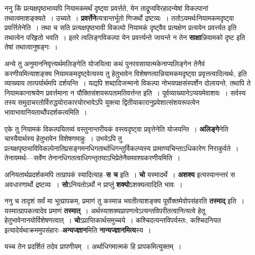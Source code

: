 \documentclass[article,12pt,a4paper]{memoir}
\begin{document}
	  \pstart ननु किं प्रत्यक्षपृष्ठभाव्यपि नियामकमर्थं दृष्ट्वा प्रवर्त्तते, येन ताद्रूप्यविरहादन्येषां विकल्पानां तथात्वमाशङ्क्यते । उच्यते । \textbf{प्रवर्त्तेने}त्यत्रान्तर्भूतो णिजर्थो द्रष्टव्यः । ततोऽयमर्थःनियामकमदृष्ट्वा प्रवर्त्तितेनेति । तथा च सति प्रत्यक्षपृष्ठभावी विकल्पो नियामकं दृष्ट्वैव प्रत्यक्षेण प्रत्ययेन प्रवर्त्त्यत इति तथात्वेन परिहृतो भवति । इतरे त्वलिङ्गविकल्पा येन प्रवर्त्त्यन्ते जायन्ते न तेन \textbf{साक्षा}न्नियामको दृष्ट इति तेषां तथात्वानुषङ्गः ।
	\pend
      

	  \pstart अन्ये तु अनुमाननिवृत्त्यर्थमलिङ्गेति योजयित्वा कथं पुनरवसायात्मकेनाप्यलिङ्गेन तेनैवं करणीयमित्याशङ्क्य नियामकमदृष्ट्वेत्यस्य तु हेतुभावेन विशेषणत्वान्नियामकमदृष्ट्वा प्रवृत्तत्वादित्यर्थः, इति व्याख्याय तात्पर्यार्थमपि दर्शयन्ति । यद्यपि शब्दादिजन्मानो विकल्पा नोभयपक्षसंस्पर्शेन दोलायन्ते, तथापि ते नियामकानाश्रयेण प्रवर्त्तमाना न यौक्तिसंशयरूपतामतिवर्त्तन्त इति । पूर्वव्याख्यानेऽप्ययमेवाशयः । सर्वस्य तस्य समुदाचरतोर्विरुद्धयोराकारयोरभावेऽपि युक्त्या द्वितीयाकारानुप्रवेशात्संशयरूपत्वेन भावाभावानियतार्थोपदर्शकत्वमिति ।
	\pend
      

	  \pstart एके तु नियामकं विकल्पयितव्यं वस्तुनान्तरीयकं वस्त्वदृष्ट्वा प्रवृत्तेनेति योजयन्ति । \textbf{अलिङ्गे}नेति चास्यैवार्थस्य हेतुभावेन विशेषणमाहुः । उभयेऽपि तु प्रत्यक्षपृष्ठभाविविकल्पेनातिप्रसङ्गमनधिगतार्थाधिगन्तुर्विकल्प्यस्य प्रामाण्यचिन्ताऽधिकारेण निराकुर्वते । तेनायमर्थः—सर्वेण तेनानधिगतत्वाधिगन्तृतयाऽभिप्रेतेनैवमवश्यकरणीयमिति ।
	\pend
      

	  \pstart अनियतार्थप्रदर्शकमपि तत्प्रापकं स्यादित्याह--\textbf{स च} इति । \textbf{चो} यस्मादर्थे । \textbf{अशक्य} इत्यस्यानन्तरं स अवधारणार्थो द्रष्टव्यः । \textbf{सो}ऽनियतोऽर्थो न प्राप्तुं \textbf{शक्यो}ऽशक्यत्वादिति भावः ।
	\pend
      

	  \pstart ननु च तादृशं सर्वं मा भूत्प्रापकम्, प्रमाणं तु कस्मान्न भवतीत्याशङ्क्य पूर्वोक्तमेवोपसंहरति \textbf{तस्माद्} इति । यस्मात्प्रापकत्वादेव प्रमाणं \textbf{तस्मात्} । अर्थस्याशक्यप्रापणत्वेऽत्यन्तविपरीतत्वानित्यत्वे हेतू हेतुभावेनानयोर्विशेषणत्वात् । \textbf{चो}ऽप्राप्तिकार्थसमुच्चये । कश्चिदत्यन्तविपर्यस्तः, कश्चिदनियत इत्यादेर्यथाक्रममुपसंहारः--\textbf{अन्यज्ज्ञान}मिति \textbf{नान्यज्ज्ञानमित्य}स्य ।
	\pend
	  \bigskip
	  \begingroup
	

	  \pstart यच्च तेन प्रदर्शितं तदेव प्रापणीयम् । अर्थाधिगमात्मकं हि प्रापकमित्युक्तम् ।
	\pend
      
\end{document}
